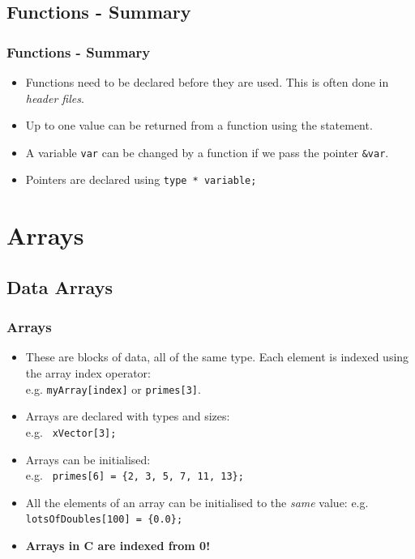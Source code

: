 \documentclass[smaller,handout,table]{beamer}
\begin{document}
\subsection{Functions - Summary}
\begin{frame}
\frametitle{Functions - Summary}
\begin{itemize}
\item Functions need to be declared before they are used. This is often done in \emph{header files}.
\item Up to one value can be returned from a function using the  statement.
\item A variable {\tt var} can be changed by a function if we pass the pointer
{\tt \&var}.
\item Pointers are declared using {\tt type * variable;}
\end{itemize}
\end{frame}

\section{Arrays}
\subsection{Data Arrays}
\begin{frame}
\frametitle{Arrays}
\begin{itemize}
\item These are blocks of data, all of the same type. Each element is indexed
using the array index operator:\\
e.g. {\tt myArray[index]} or {\tt primes[3]}.
\item Arrays are declared with types and sizes:\\
e.g. {\tt {} xVector[3];}
\item Arrays can be initialised:\\
e.g. {\tt {} primes[6] = \{2, 3, 5, 7, 11, 13\};}
\item All the elements of an array can be initialised to the \emph{same} value:
e.g. {\tt {} lotsOfDoubles[100] = \{0.0\};}
\item \bf Arrays in C are indexed from 0!
\end{itemize}
\end{frame}
\end{document}
